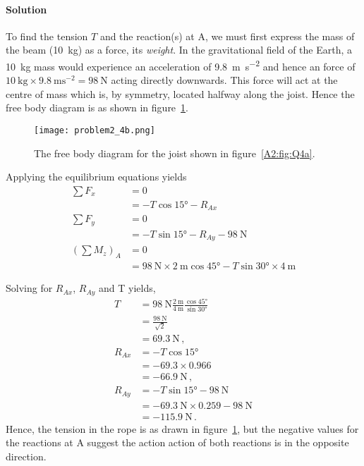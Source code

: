 \documentclass[a4paper,justified,oneside]{tufte-handout}
\numberwithin{equation}{subsection}
\begin{document}
\begin{solution}
\paragraph{Solution}
To find the tension $T$ and the reaction(s) at A, we must first express the mass of the beam (\SI{10}{\kg}) as a force, its \emph{weight}. In the gravitational field of the Earth, a \SI{10}{\kg} mass would experience an acceleration of \SI{9.8}{\m\s^{-2}} and hence an force of $\SI{10}{\kg} \times \SI{9.8}{\m\s^{-2}} = \SI{98}{\N}$ acting directly downwards. This force will act at the centre of mass which is, by symmetry, located halfway along the joist. Hence the free body diagram is as shown in figure~\ref{A2:fig:Q4b}.
\begin{figure}
	\centering
	\texttt{[image: problem2\_4b.png]}
	\caption{The free body diagram for the joist shown in figure~\protect\ref{A2:fig:Q4a}.}
	\label{A2:fig:Q4b}
\end{figure}

Applying the equilibrium equations yields
\begin{align*}
	\sum F_x	&=	0	\\
				&=	-T\cos\ang{15}	-R_{Ax}	\\
	\sum F_y	&=	0	\\
				&=	-T\sin\ang{15}	-R_{Ay}	-\SI{98}{\N}	\\
	\left(\sum M_z\right)_A	&=	0	\\
							&=	\SI{98}{\N} \times \SI{2}{\m} \cos\ang{45}	-T\sin\ang{30} \times \SI{4}{\m}
\end{align*}

Solving for $R_{Ax}$, $R_{Ay}$ and T yields,
\begin{align*}
	T		&=	\SI{98}{\N} \frac{\SI{2}{\m}}{\SI{4}{\m}} \frac{\cos\ang{45}}{\sin\ang{30}}	\\
			&=	\frac{\SI{98}{\N}}{\sqrt{2}}	\\
			&=	\SI{69.3}{\N}	\,,	\\
	R_{Ax}	&=	-T\cos\ang{15}	\\	
			&=	\SI{-69.3} \times 0.966	\\
			&=	\SI{-66.9}{\N}	\,,	\\
	R_{Ay}	&=	-T\sin\ang{15} -\SI{98}{\N}	\\
			&=	\SI{-69.3}{\N} \times 0.259 -\SI{98}{\N}	\\
			&=	\SI{-115.9}{\N}	\,.
\end{align*}
Hence, the tension in the rope is as drawn in figure~\ref{A2:fig:Q4b}, but the negative values for the reactions at A suggest the action action of both reactions is in the opposite direction. 
\end{solution}
\end{document}
